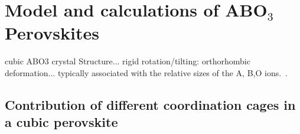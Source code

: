 \documentclass[a4paper,prb]{revtex4-1}  %
\newcommand{\com}[1]{}
\newcommand{\az}[1]{{\color{magenta}{#1}}} %
\begin{document}
 





\com{
\begin{align}
E_{xy} =&
\frac{32}{7} \left[
\left(1-\frac{1}{(\delta +1)^3}\right) D_2
-
\left(1-\frac{1}{(\delta +1)^5}\right) \frac{20}{9}D_4
\right]\frac{q_o}{a},\\
E_{yz} =& E_{zx} = -3/2 E_{xy},
\end{align}
as measured from their average 
$E_0^{t_{2g}} = -64q_oD_4 \left(2+(\delta +1)^{-5}\right)/9a$.
Similarly, $e_g$ splits up as
\begin{align}
E_{x^2-y^2}=&\frac{32}{7} \left[\left(1-\frac{1}{(\delta +1)^3}\right) \text{D2}+\frac{5}{3}\left(1-\frac{1}{(\delta +1)^5}\right) \text{D4}\right]\frac{q_o}{a},\\
E_{z^2}=&-E_{x^2-y^2},
\end{align}
measured from their average 
$E_0^{e_{g}} = 32 q_oD_4 \left(2+(\delta +1)^{-5}\right)/3a$.
The crystal field splitting becomes
\begin{align}
\Delta \equiv E_0^{e_{g}}-E_0^{t_{2g}}=\frac{160}{9} \left(\frac{1}{(\delta +1)^5}+2\right) D_4.
\end{align}
}




\az{just a brief description... cooperative JT and orbital order}


\section{Model and calculations of ABO$_3$ Perovskites}%

cubic ABO3 crystal Structure... 
rigid rotation/tilting: orthorhombic deformation... 
typically associated with the relative sizes of the A, B,O ions.~\cite{goodenoughPRL05}.


\subsection{Contribution of different coordination cages in a cubic perovskite}
\label{sec:relativeVoctABO}
\end{document}

